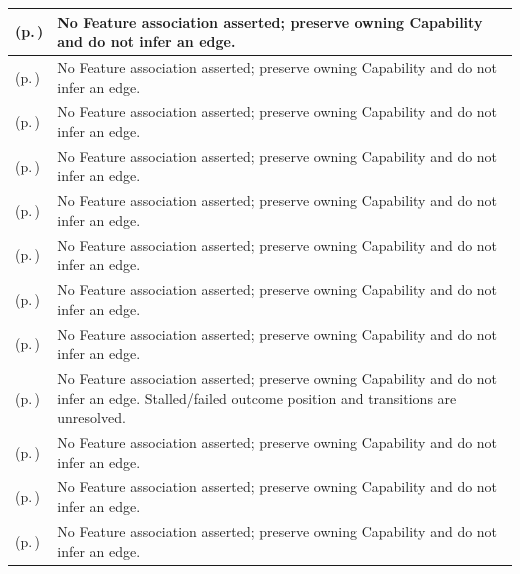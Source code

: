 \begin{longtable}{|>{\raggedright\arraybackslash}p{0.38\TableWidth}|>{\raggedright\arraybackslash}p{0.62\TableWidth}|}
\nameref{process:clinic-operational-queue-progression-process} (p.\,\pageref{process:clinic-operational-queue-progression-process}) & No Feature association asserted; preserve owning Capability and do not infer an edge.\\\hline
\nameref{process:bed-turnover-process} (p.\,\pageref{process:bed-turnover-process}) & No Feature association asserted; preserve owning Capability and do not infer an edge.\\\hline
\nameref{process:operational-work-progression-process} (p.\,\pageref{process:operational-work-progression-process}) & No Feature association asserted; preserve owning Capability and do not infer an edge.\\\hline
\nameref{process:patient-transport-process} (p.\,\pageref{process:patient-transport-process}) & No Feature association asserted; preserve owning Capability and do not infer an edge.\\\hline
\nameref{process:specimen-transport-process} (p.\,\pageref{process:specimen-transport-process}) & No Feature association asserted; preserve owning Capability and do not infer an edge.\\\hline
\nameref{process:discharge-progression-process} (p.\,\pageref{process:discharge-progression-process}) & No Feature association asserted; preserve owning Capability and do not infer an edge.\\\hline
\nameref{process:work-order-progression-process} (p.\,\pageref{process:work-order-progression-process}) & No Feature association asserted; preserve owning Capability and do not infer an edge.\\\hline
\nameref{process:to-do-progression-process} (p.\,\pageref{process:to-do-progression-process}) & No Feature association asserted; preserve owning Capability and do not infer an edge.\\\hline
\nameref{process:synthetic-task-progression-process} (p.\,\pageref{process:synthetic-task-progression-process}) & No Feature association asserted; preserve owning Capability and do not infer an edge. Stalled/failed outcome position and transitions are unresolved.\\\hline
\nameref{process:assurance-process-design} (p.\,\pageref{process:assurance-process-design}) & No Feature association asserted; preserve owning Capability and do not infer an edge.\\\hline
\nameref{process:assurance-process-execution} (p.\,\pageref{process:assurance-process-execution}) & No Feature association asserted; preserve owning Capability and do not infer an edge.\\\hline
\nameref{process:assurance-process-reporting-communication} (p.\,\pageref{process:assurance-process-reporting-communication}) & No Feature association asserted; preserve owning Capability and do not infer an edge.\\\hline
\end{longtable}\endgroup
